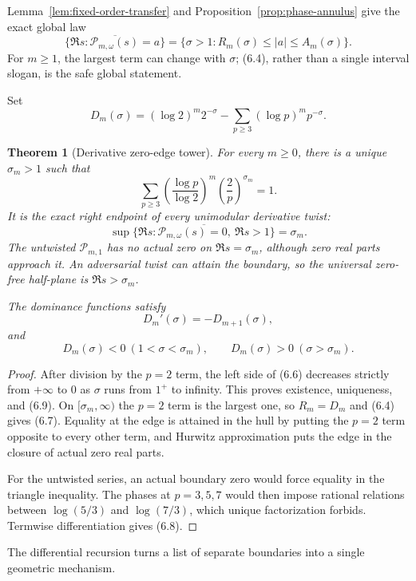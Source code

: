\documentclass[11pt]{article}
\newtheorem{theorem}{Theorem}[section]
\theoremstyle{definition}
\theoremstyle{remark}
\newcommand{\cP}{\mathcal P}
\begin{document}
Lemma~\ref{lem:fixed-order-transfer} and
Proposition~\ref{prop:phase-annulus} give the exact global law
\[
 \overline{\{\Re s:\cP_{m,\omega}(s)=a\}}
 =\{\sigma>1:R_m(\sigma)\le |a|\le A_m(\sigma)\}.
\tag{6.4}
\]
For $m\ge1$, the largest term can change with $\sigma$; (6.4), rather than a single
interval slogan, is the safe global statement.

Set
\[
 D_m(\sigma)=
 (\log2)^m2^{-\sigma}-\sum_{p\ge3}(\log p)^mp^{-\sigma}.
\tag{6.5}
\]

\begin{theorem}[Derivative zero-edge tower]
\label{thm:derivative-edge}
For every $m\ge0$, there is a unique $\sigma_m>1$ such that
\[
 \boxed{
 \sum_{p\ge3}
 \left(\frac{\log p}{\log2}\right)^m
 \left(\frac2p\right)^{\sigma_m}=1.
 }
\tag{6.6}
\]
It is the exact right endpoint of every unimodular derivative twist:
\[
 \sup\overline{\{\Re s:\cP_{m,\omega}(s)=0,\ \Re s>1\}}
 =\sigma_m.
\tag{6.7}
\]
The untwisted $\cP_{m,1}$ has no actual zero on
$\Re s=\sigma_m$, although zero real parts approach it.  An adversarial twist can
attain the boundary, so the universal zero-free half-plane is
$\Re s>\sigma_m$.

The dominance functions satisfy
\[
 \boxed{D_m'(\sigma)=-D_{m+1}(\sigma),}
\tag{6.8}
\]
and
\[
 D_m(\sigma)<0\ (1<\sigma<\sigma_m),
 \qquad
 D_m(\sigma)>0\ (\sigma>\sigma_m).
\tag{6.9}
\]
\end{theorem}

\begin{proof}
After division by the $p=2$ term, the left side of (6.6) decreases strictly from
$+\infty$ to $0$ as $\sigma$ runs from $1^+$ to infinity.  This proves existence,
uniqueness, and (6.9).  On $[\sigma_m,\infty)$ the $p=2$ term is the largest one, so
$R_m=D_m$ and (6.4) gives (6.7).  Equality at the edge is attained in the hull by
putting the $p=2$ term opposite to every other term, and Hurwitz approximation puts the
edge in the closure of actual zero real parts.

For the untwisted series, an actual boundary zero would force equality in the triangle
inequality.  The phases at $p=3,5,7$ would then impose rational relations between
$\log(5/3)$ and $\log(7/3)$, which unique factorization forbids.  Termwise
differentiation gives (6.8).
\end{proof}

The differential recursion turns a list of separate boundaries into a single
geometric mechanism.
\end{document}
